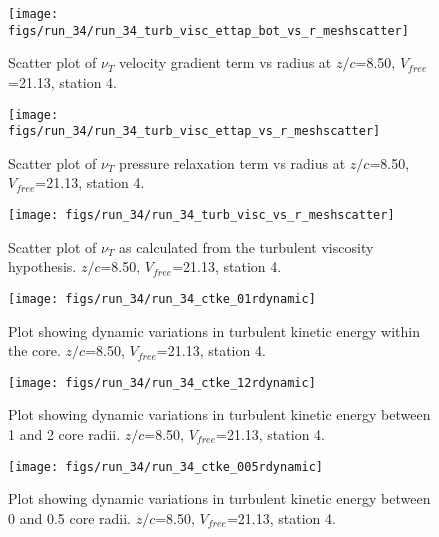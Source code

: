 \begin{figure}[H]
\centering
\texttt{[image: figs/run\_34/run\_34\_turb\_visc\_ettap\_bot\_vs\_r\_meshscatter]}
\caption{Scatter plot of $\nu_T$ velocity gradient term vs radius at $z/c$=8.50, $V_{free}$=21.13, station 4.}
\end{figure}


\begin{figure}[H]
\centering
\texttt{[image: figs/run\_34/run\_34\_turb\_visc\_ettap\_vs\_r\_meshscatter]}
\caption{Scatter plot of $\nu_T$ pressure relaxation term vs radius at $z/c$=8.50, $V_{free}$=21.13, station 4.}
\end{figure}


\begin{figure}[H]
\centering
\texttt{[image: figs/run\_34/run\_34\_turb\_visc\_vs\_r\_meshscatter]}
\caption{Scatter plot of $\nu_T$ as calculated from the turbulent viscosity hypothesis. $z/c$=8.50, $V_{free}$=21.13, station 4.}
\end{figure}


\begin{figure}[H]
\centering
\texttt{[image: figs/run\_34/run\_34\_ctke\_01rdynamic]}
\caption{Plot showing dynamic variations in turbulent kinetic energy within the core. $z/c$=8.50, $V_{free}$=21.13, station 4.}
\end{figure}


\begin{figure}[H]
\centering
\texttt{[image: figs/run\_34/run\_34\_ctke\_12rdynamic]}
\caption{Plot showing dynamic variations in turbulent kinetic energy between 1 and 2 core radii. $z/c$=8.50, $V_{free}$=21.13, station 4.}
\end{figure}


\begin{figure}[H]
\centering
\texttt{[image: figs/run\_34/run\_34\_ctke\_005rdynamic]}
\caption{Plot showing dynamic variations in turbulent kinetic energy between 0 and 0.5 core radii. $z/c$=8.50, $V_{free}$=21.13, station 4.}
\end{figure}


